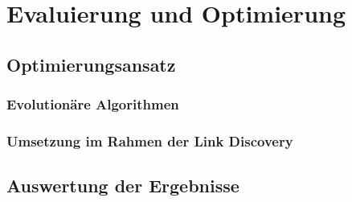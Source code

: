 \chapter{Evaluierung und Optimierung}

\section{Optimierungsansatz}

\subsection{Evolutionäre Algorithmen}

\subsection{Umsetzung im Rahmen der Link Discovery}

\section{Auswertung der Ergebnisse}